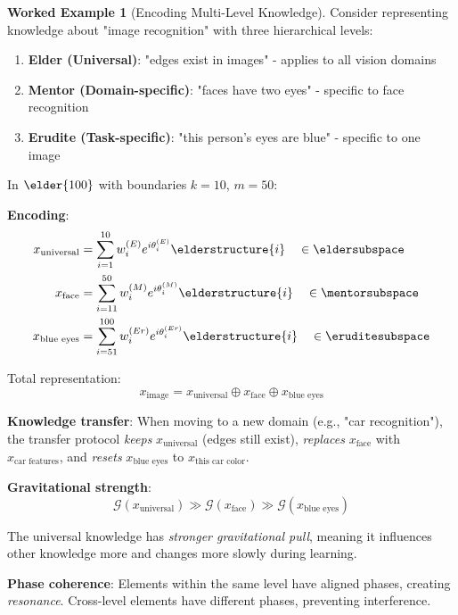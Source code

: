 \documentclass[12pt,a4paper]{article}
\theoremstyle{definition}
\newtheorem{example}{Worked Example}[section]
\theoremstyle{remark}
\begin{document}
\begin{example}[Encoding Multi-Level Knowledge]
Consider representing knowledge about "image recognition" with three hierarchical levels:

\begin{enumerate}
\item \textbf{Elder (Universal)}: "edges exist in images" - applies to all vision domains
\item \textbf{Mentor (Domain-specific)}: "faces have two eyes" - specific to face recognition
\item \textbf{Erudite (Task-specific)}: "this person's eyes are blue" - specific to one image
\end{enumerate}

In $\elder{100}$ with boundaries $k=10$, $m=50$:

\textbf{Encoding}:
\begin{align}
x_{\text{universal}} &= \sum_{i=1}^{10} w_i^{(E)} e^{i\theta_i^{(E)}} \elderstructure{i} \quad \in \eldersubspace \\
x_{\text{face}} &= \sum_{i=11}^{50} w_i^{(M)} e^{i\theta_i^{(M)}} \elderstructure{i} \quad \in \mentorsubspace \\
x_{\text{blue eyes}} &= \sum_{i=51}^{100} w_i^{(Er)} e^{i\theta_i^{(Er)}} \elderstructure{i} \quad \in \eruditesubspace
\end{align}

Total representation:
$$x_{\text{image}} = x_{\text{universal}} \oplus x_{\text{face}} \oplus x_{\text{blue eyes}}$$

\textbf{Knowledge transfer}: When moving to a new domain (e.g., "car recognition"), the transfer protocol \textit{keeps} $x_{\text{universal}}$ (edges still exist), \textit{replaces} $x_{\text{face}}$ with $x_{\text{car features}}$, and \textit{resets} $x_{\text{blue eyes}}$ to $x_{\text{this car color}}$.

\textbf{Gravitational strength}:
$$\mathcal{G}(x_{\text{universal}}) \gg \mathcal{G}(x_{\text{face}}) \gg \mathcal{G}(x_{\text{blue eyes}})$$

The universal knowledge has \textit{stronger gravitational pull}, meaning it influences other knowledge more and changes more slowly during learning.

\textbf{Phase coherence}: Elements within the same level have aligned phases, creating \textit{resonance}. Cross-level elements have different phases, preventing interference.
\end{example}
\end{document}
